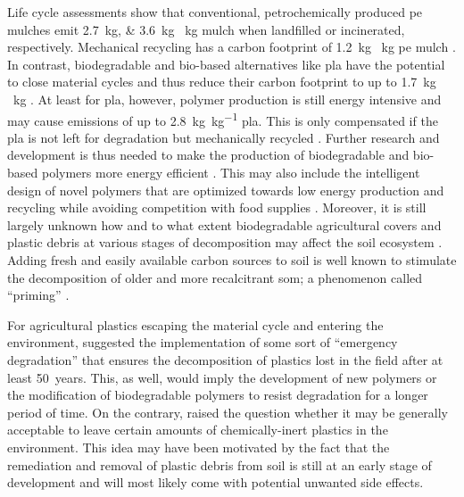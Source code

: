 Life cycle assessments show that conventional, petrochemically produced \ac{pe} mulches emit \SIlist{2.7;3.6}{\kilo\gram}  \si{\per\kilo\gram} mulch when landfilled or incinerated, respectively. Mechanical recycling has a carbon footprint of \SI{1.2}{\kilo\gram}  \si{\per\kilo\gram} \ac{pe} mulch \citep{BosLife2008}. In contrast, biodegradable and bio-based alternatives like \ac{pla} have the potential to close material cycles and thus reduce their carbon footprint to up to \SI{1.7}{\kilo\gram}  \si{\per\kilo\gram} \citep{KollerSwitching2019,RezvaniGhomiLife2021}. At least for \ac{pla}, however, polymer production is still energy intensive and may cause  emissions of up to \SI{2.8}{\kilo\gram\per\kilo\gram} \ac{pla}. This is only compensated if the \ac{pla} is not left for degradation but mechanically recycled \citep{RezvaniGhomiLife2021,AltmanMyth2021}. Further research and development is thus needed to make the production of biodegradable and bio-based polymers more energy efficient \citep{VieraAre2021}. This may also include the intelligent design of novel polymers that are optimized towards low energy production and recycling \citep{VieraAre2021,KorleyPolymer2021,KakadellisAchieving2021} while avoiding competition with food supplies \citep{RhodesPlastic2018}. Moreover, it is still largely unknown how and to what extent biodegradable agricultural covers and plastic debris at various stages of decomposition may affect the soil ecosystem \citep{SanderBiodegradation2019,QinReview2021,AltmanMyth2021}. Adding fresh and easily available carbon sources to soil is well known to stimulate the decomposition of older and more recalcitrant \ac{som}; a phenomenon called ``priming'' \citep{ChenMixing2020}.

For agricultural plastics escaping the material cycle and entering the environment, \citet{BertlingKunststoffe2021} suggested the implementation of some sort of ``emergency degradation'' that ensures the decomposition of plastics lost in the field after at least 50~years. This, as well, would imply the development of new polymers or the modification of biodegradable polymers to resist degradation for a longer period of time. On the contrary, \citet{ScalengheResource2018} raised the question whether it may be generally acceptable to leave certain amounts of chemically-inert plastics in the environment. This idea may have been motivated by the fact that the remediation and removal of plastic debris from soil is still at an early stage of development \citep{PadervandRemoval2020} and will most likely come with potential unwanted side effects.

